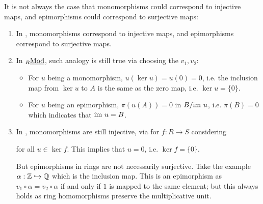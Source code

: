 \documentclass{article}
\begin{document}
\begin{example}
    It is not always the case that monomorphisms could correspond to injective maps, and epimorphisms could correspond to surjective maps:
    \begin{enumerate}
        \item In \catsets, monomorphisms correspond to injective maps, and epimorphisms correspond to surjective maps.
        \item In ${}_{R}\underline{\textup{Mod}}$, such analogy is still true via choosing the $v_1, v_2$:
        \begin{figure}[htbp]
            \centering
            \begin{minipage}{0.48\linewidth}
                \centering
            \end{minipage}
            \begin{minipage}{0.48\linewidth}
                \centering
            \end{minipage}
        \end{figure}
        \begin{itemize}
            \item For $u$ being a monomorphism, $u(\ker u) = u(0) = 0$, i.e. the inclusion map from $\ker u$ to $A$ is the same as the zero map, i.e. $\ker u = \{0\}$. 
            \item For $u$ being an epimorphism, $\pi(u(A)) = 0$ in $B / \mathrm{im}\  u$, i.e. $\pi(B) = 0$ which indicates that $\mathrm{im}\  u = B$.
        \end{itemize}
        \item In \catrings, monomorphisms are still injective, via for $f: R\to S$ considering
        for all $u \in \ker f$. This implies that $u = 0$, i.e. $\ker f = \{0\}$.

        But epimorphisms in rings are not necessarily surjective. Take the example $\alpha: \mathbb{Z} \hookrightarrow \mathbb{Q}$ which is the inclusion map. This is an epimorphism as $v_1 \circ \alpha = v_2 \circ \alpha$ if and only if $1$ is mapped to the same element; but this always holds as ring homomorphisms preserve the multiplicative unit. 
    \end{enumerate}
\end{example}
\end{document}
